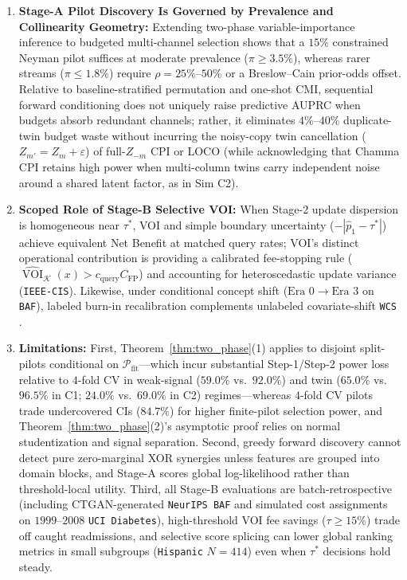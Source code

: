 \documentclass[11pt]{article}
\theoremstyle{remark}
\begin{document}
\begin{enumerate}
  \item \textbf{Stage-A Pilot Discovery Is Governed by Prevalence and Collinearity Geometry:} Extending two-phase variable-importance inference \citep{williamson2023general,dai2025twophase} to budgeted multi-channel selection shows that a $15\%$ constrained Neyman pilot suffices at moderate prevalence ($\pi \ge 3.5\%$), whereas rarer streams ($\pi \le 1.8\%$) require $\rho = 25\%\text{--}50\%$ or a Breslow--Cain prior-odds offset. Relative to baseline-stratified permutation and one-shot CMI, sequential forward conditioning does not uniquely raise predictive AUPRC when budgets absorb redundant channels; rather, it eliminates $4\%\text{--}40\%$ duplicate-twin budget waste without incurring the noisy-copy twin cancellation ($Z_{m'} = Z_m + \varepsilon$) of full-$Z_{-m}$ CPI or LOCO (while acknowledging that Chamma CPI retains high power when multi-column twins carry independent noise around a shared latent factor, as in Sim C2).
  \item \textbf{Scoped Role of Stage-B Selective VOI:} When Stage-2 update dispersion is homogeneous near $\tau^*$, VOI and simple boundary uncertainty ($-|\hat{p}_1 - \tau^*|$) achieve equivalent Net Benefit at matched query rates; VOI's distinct operational contribution is providing a calibrated fee-stopping rule ($\widehat{\operatorname{VOI}}_{\mathcal{K}}(x) > c_{\text{query}}C_{\text{FP}}$) and accounting for heteroscedastic update variance (\texttt{IEEE-CIS}). Likewise, under conditional concept shift ($\text{Era }0 \to \text{Era }3$ on \texttt{BAF}), labeled burn-in recalibration complements unlabeled covariate-shift \texttt{WCS} \citep{jin2025wcs}.
  \item \textbf{Limitations:} First, Theorem~\ref{thm:two_phase}(1) applies to disjoint split-pilots conditional on $\mathcal{P}_{\text{fit}}$---which incur substantial Step-1/Step-2 power loss relative to $4$-fold CV in weak-signal ($59.0\%$ vs.\ $92.0\%$) and twin ($65.0\%$ vs.\ $96.5\%$ in C1; $24.0\%$ vs.\ $69.0\%$ in C2) regimes---whereas $4$-fold CV pilots trade undercovered CIs ($84.7\%$) for higher finite-pilot selection power, and Theorem~\ref{thm:two_phase}(2)'s asymptotic proof relies on normal studentization and signal separation. Second, greedy forward discovery cannot detect pure zero-marginal XOR synergies unless features are grouped into domain blocks, and Stage-A scores global log-likelihood rather than threshold-local utility. Third, all Stage-B evaluations are batch-retrospective (including CTGAN-generated \texttt{NeurIPS BAF} and simulated cost assignments on $1999\text{--}2008$ \texttt{UCI Diabetes}), high-threshold VOI fee savings ($\tau \ge 15\%$) trade off caught readmissions, and selective score splicing can lower global ranking metrics in small subgroups (\texttt{Hispanic} $N=414$) even when $\tau^*$ decisions hold steady.
\end{enumerate}
\end{document}
